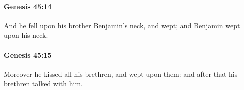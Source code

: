 		\paragraph{Genesis 45:14} %
			\label{GENESIS-45-14}

			And he fell upon his brother Benjamin's neck, and wept; and Benjamin wept upon his neck.


		\paragraph{Genesis 45:15} %
			\label{GENESIS-45-15}

			Moreover he kissed all his brethren, and wept upon them: and after that his brethren talked with him.


